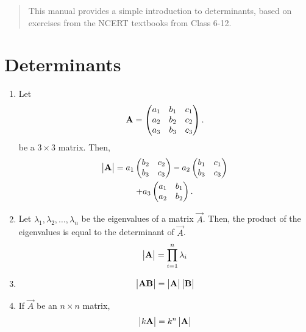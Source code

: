 \documentclass[journal,12pt,twocolumn]{IEEEtran}
\renewcommand\thesection{\arabic{section}}
\begin{document}



%

\begin{abstract}
This manual provides a simple introduction to determinants, 
based on exercises from the NCERT textbooks from Class 6-12.  
\end{abstract}

\section{Determinants}
\renewcommand{\theequation}{\theenumi}
\begin{enumerate}[label=\thesection.\arabic*.,ref=\thesection.\theenumi]

\item Let 
\begin{align}
	\mathbf{A} = \begin{pmatrix} a_1 & b_1 & c_1  \\ a_2 & b_2 & c_2  \\ a_3 & b_3 & c_3\end{pmatrix}.
\end{align}
be a $3 \times 3$ matrix. 
Then, 
\begin{multline}
	\begin{vmatrix}\mathbf{A}\end{vmatrix} = a_1 \begin{pmatrix}  b_2 & c_2 \\  b_3 & c_3\end{pmatrix} - a_2\begin{pmatrix}  b_1 & c_1 \\  b_3 & c_3 \end{pmatrix}  \\ + a_3\begin{pmatrix} a_1 & b_1 \\ a_2 & b_2 \end{pmatrix}.
\end{multline}
\item Let $\lambda_1,\lambda_2, \dots, \lambda_n$ be the eigenvalues of a matrix $\vec{A}$.  Then,   the product of the eigenvalues is equal to the determinant of $\vec{A}$.
\begin{align}
	\begin{vmatrix}\mathbf{A}\end{vmatrix} = \prod_{i=1}^{n}\lambda_i
\end{align}
%
\item 
\begin{align}
	\begin{vmatrix}\mathbf{A}\mathbf{B}\end{vmatrix} = \begin{vmatrix}\mathbf{A}\end{vmatrix}\begin{vmatrix}\mathbf{B}\end{vmatrix}
\end{align}
\item If $\vec{A}$ be an $n \times n$ matrix, 
\begin{align}
	\begin{vmatrix}k\mathbf{A}\end{vmatrix} = k^n\begin{vmatrix}\mathbf{A}\end{vmatrix}
\end{align}

\end{enumerate}
\end{document}
